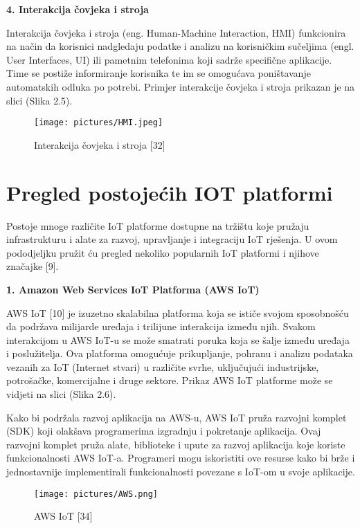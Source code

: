 \documentclass[times, utf8, zavrsni]{fer}
\begin{document}
\textbf{4. Interakcija čovjeka i stroja}

Interakcija čovjeka i stroja (eng. Human-Machine Interaction, HMI) funkcionira na način da korisnici nadgledaju podatke i analizu na korisničkim sučeljima (engl. User Interfaces, UI) ili pametnim telefonima koji sadrže specifične aplikacije. Time se postiže informiranje korisnika te im se omogućava poništavanje automatskih odluka po potrebi. Primjer interakcije čovjeka i stroja prikazan je na slici (Slika 2.5).
 
\begin{figure}[h]
			\texttt{[image: pictures/HMI.jpeg]} %
		\centering
			\caption{ Interakcija čovjeka i stroja [32]}
			\label{fig:promjene}
\end{figure}

 \section{Pregled postojećih IOT platformi }
 Postoje mnoge različite IoT platforme dostupne na tržištu koje pružaju infrastrukturu i alate za razvoj, upravljanje i integraciju IoT rješenja. U ovom pododjeljku pružit ću pregled nekoliko popularnih IoT platformi i njihove značajke [9].
   \vspace{\baselineskip}
 
\textbf{ 1. Amazon Web Services IoT Platforma (AWS IoT)}
 
AWS IoT [10] je izuzetno skalabilna platforma koja se ističe svojom sposobnošću da podržava milijarde uređaja i trilijune interakcija između njih. Svakom interakcijom u AWS IoT-u se može smatrati poruka koja se šalje između uređaja i poslužitelja. Ova platforma omogućuje prikupljanje, pohranu i analizu podataka vezanih za IoT (Internet stvari) u različite svrhe, uključujući industrijske, potrošačke, komercijalne i druge sektore. Prikaz AWS IoT platforme može se vidjeti na slici (Slika 2.6).

Kako bi podržala razvoj aplikacija na AWS-u, AWS IoT pruža razvojni komplet (SDK) koji olakšava programerima izgradnju i pokretanje aplikacija. Ovaj razvojni komplet pruža alate, biblioteke i upute za razvoj aplikacija koje koriste funkcionalnosti AWS IoT-a. Programeri mogu iskoristiti ove resurse kako bi brže i jednostavnije implementirali funkcionalnosti povezane s IoT-om u svoje aplikacije.


\begin{figure}[h]
			\texttt{[image: pictures/AWS.png]} %
		\centering
			\caption{ AWS IoT [34]}
			\label{fig:promjene}
\end{figure}
\end{document}

